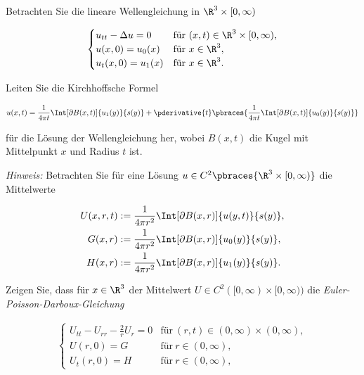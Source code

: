 
\begin{exercise}

Betrachten Sie die lineare Wellengleichung in $\R^3 \times [0, \infty)$

\begin{align*}
    \begin{cases}
        u_{tt} - \Delta u = 0 & \text{für}~ (x, t) \in \R^3 \times [0, \infty), \\
        u(x, 0) = u_0(x)    & \text{für}~ x \in \R^3, \\
        u_t(x, 0) = u_1(x)  & \text{für}~ x \in \R^3.
    \end{cases}
\end{align*}

Leiten Sie die Kirchhoffsche Formel

\begin{align*}    
    u(x, t)
    =
    \frac{1}{4 \pi t}
    \Int[\partial B(x, t)]{u_1(y)}{s(y)}
    +
    \pderivative{t}
    \pbraces
    {
        \frac{1}{4 \pi t}
        \Int[\partial B(x, t)]{u_0(y)}{s(y)}
    }
\end{align*}

für die Lösung der Wellengleichung her, wobei $B(x, t)$ die Kugel mit Mittelpunkt $x$ und Radius $t$ ist.

\textit{Hinweis:}
Betrachten Sie für eine Lösung $u \in C^2 \pbraces{\R^3 \times [0, \infty)}$ die Mittelwerte

\begin{align*}
    U(x, r, t) & := \frac{1}{4 \pi r^2} \Int[\partial B(x, r)]{u(y, t)}{s(y)}, \\
    G(x, r)    & := \frac{1}{4 \pi r^2} \Int[\partial B(x, r)]{u_0(y)}{s(y)}, \\
    H(x, r)    & := \frac{1}{4 \pi r^2} \Int[\partial B(x, r)]{u_1(y)}{s(y)}.
\end{align*}

Zeigen Sie, dass für $x \in \R^3$ der Mittelwert $U \in C^2([0, \infty) \times [0, \infty))$  die \textit{Euler-Poisson-Darboux-Gleichung}

\begin{align*}
    \begin{cases}
        U_{tt} - U_{rr} - \frac{2}{r} U_r = 0 & \text{für}~(r, t) \in (0, \infty) \times (0, \infty), \\
        U(r, 0) = G                             & \text{für}~ r \in (0, \infty), \\
        U_t(r, 0)                           = H & \text{für}~ r \in (0, \infty),
    \end{cases}
\end{align*}


\end{exercise}
